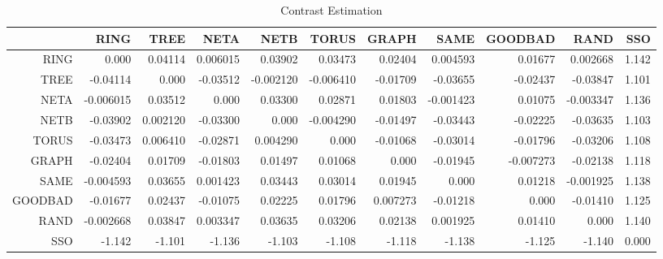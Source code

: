 \documentclass[a4paper,10pt]{article}
\begin{document}
\begin{landscape}
\begin{table}[!htp]
\centering\tiny
\caption{Contrast Estimation}
\begin{tabular}{
|r|r|r|r|r|r|r|r|r|r|r|}
\hline
 & RING& TREE& NETA& NETB& TORUS& GRAPH& SAME& GOODBAD& RAND& SSO\\
\hline
 RING&0.000&0.04114&0.006015&0.03902&0.03473&0.02404&0.004593&0.01677&0.002668&1.142\\
\hline
 TREE&-0.04114&0.000&-0.03512&-0.002120&-0.006410&-0.01709&-0.03655&-0.02437&-0.03847&1.101\\
\hline
 NETA&-0.006015&0.03512&0.000&0.03300&0.02871&0.01803&-0.001423&0.01075&-0.003347&1.136\\
\hline
 NETB&-0.03902&0.002120&-0.03300&0.000&-0.004290&-0.01497&-0.03443&-0.02225&-0.03635&1.103\\
\hline
 TORUS&-0.03473&0.006410&-0.02871&0.004290&0.000&-0.01068&-0.03014&-0.01796&-0.03206&1.108\\
\hline
 GRAPH&-0.02404&0.01709&-0.01803&0.01497&0.01068&0.000&-0.01945&-0.007273&-0.02138&1.118\\
\hline
 SAME&-0.004593&0.03655&0.001423&0.03443&0.03014&0.01945&0.000&0.01218&-0.001925&1.138\\
\hline
 GOODBAD&-0.01677&0.02437&-0.01075&0.02225&0.01796&0.007273&-0.01218&0.000&-0.01410&1.125\\
\hline
 RAND&-0.002668&0.03847&0.003347&0.03635&0.03206&0.02138&0.001925&0.01410&0.000&1.140\\
\hline
 SSO&-1.142&-1.101&-1.136&-1.103&-1.108&-1.118&-1.138&-1.125&-1.140&0.000\\
\hline

\end{tabular}
\end{table}

\newpage


\end{landscape}
\end{document}
